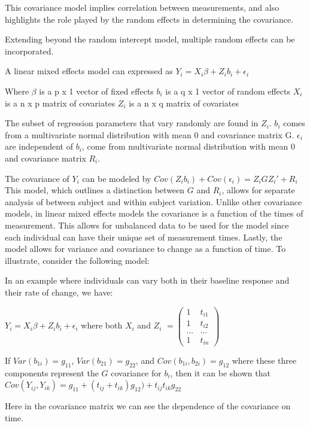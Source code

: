 \documentclass[12pt, twoside]{amherstthesis}
\theoremstyle{definition}
\theoremstyle{definition}
\theoremstyle{definition}
\theoremstyle{remark}
\begin{document}
This covariance model implies correlation between measurements, and also highlights the role played by the random effects in determining the covariance.

Extending beyond the random intercept model, multiple random effects can be incorporated.

A linear mixed effects model can expressed as \(Y_i = X_i\beta+Z_ib_i+\epsilon_i\)

Where
\(\beta\) is a p x 1 vector of fixed effects
\(b_i\) is a q x 1 vector of random effects
\(X_i\) is a n x p matrix of covariates
\(Z_i\) is a n x q matrix of covariates

The subset of regression parameters that vary randomly are found in \(Z_i\). \(b_i\) comes from a multivariate normal distribution with mean 0 and covariance matrix G. \(\epsilon_i\) are independent of \(b_i\), come from multivariate normal distribution with mean 0 and covariance matrix \(R_i\).

The covariance of \(Y_i\) can be modeled by \(Cov(Z_ib_i) + Cov(\epsilon_i) = Z_iGZ_i' + R_i\) This model, which outlines a distinction between \(G\) and \(R_i\), allows for separate analysis of between subject and within subject variation. Unlike other covariance models, in linear mixed effects models the covariance is a function of the times of measurement. This allows for unbalanced data to be used for the model since each individual can have their unique set of measurement times. Lastly, the model allows for variance and covariance to change as a function of time. To illustrate, consider the following model:

In an example where individuals can vary both in their baseline response and their rate of change, we have:

\(Y_i = X_i\beta+Z_ib_i+\epsilon_i\) where both \(X_i\) and \(Z_i\) \(= \begin{pmatrix} 1 & t_{i1} \\ 1 & t_{i2} \\ ... & ... \\ 1 & t_{in}\end{pmatrix}\)

If \(Var(b_{1i}) = g_{11}\), \(Var(b_{21}) = g_{22}\), and \(Cov(b_{1i},b_{2i}) = g_{12}\) where these three components represent the \(G\) covariance for \(b_i\), then
it can be shown that \(Cov(Y_{ij}, Y_{ik}) = g_{11} + (t_{ij} + t_{ik})g_{12}) + t_{ij}t_{ik}g_{22}\)

Here in the covariance matrix we can see the dependence of the covariance on time.
\end{document}
